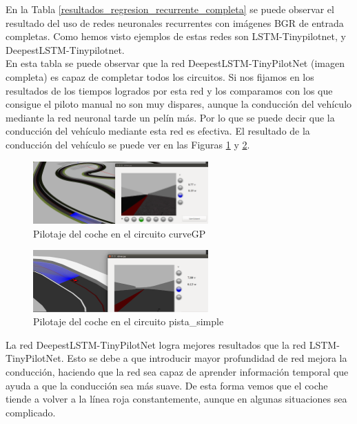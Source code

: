 En la Tabla \ref{resultados_regresion_recurrente_completa} se puede observar el resultado del uso de redes neuronales recurrentes con imágenes BGR de entrada completas. Como hemos visto ejemplos de estas redes son LSTM-Tinypilotnet, y DeepestLSTM-Tinypilotnet.\\

En esta tabla se puede observar que la red DeepestLSTM-TinyPilotNet (imagen completa) es capaz de completar todos los circuitos. Si nos fijamos en los resultados de los tiempos logrados por esta red y los comparamos con los que consigue el piloto manual no son muy dispares, aunque la conducción del vehículo mediante la red neuronal tarde un pelín más. Por lo que se puede decir que la conducción del vehículo mediante esta red es efectiva. El resultado de la conducción del vehículo se puede ver en las Figuras \ref{fig.curve_reg} y \ref{fig.small_reg}.\\

\begin{figure}
\begin{center}
	\includegraphics[width=0.6\textwidth]{figures/Regresion/deep_curve.png}
   \caption{Pilotaje del coche en el circuito curveGP}
	\label{fig.curve_reg}
\end{center}
\end{figure}

\begin{figure}
\begin{center}
	\includegraphics[width=0.6\textwidth]{figures/Regresion/deep_small.png}
   \caption{Pilotaje del coche en el circuito pista\_simple}
	\label{fig.small_reg}
\end{center}
\end{figure}



La red DeepestLSTM-TinyPilotNet logra mejores resultados que la red LSTM-TinyPilotNet. Esto se debe a que introducir mayor profundidad de red mejora la conducción, haciendo que la red sea capaz de aprender información temporal que ayuda a que la conducción sea más suave. De esta forma vemos que el coche tiende a volver a la línea roja constantemente, aunque en algunas situaciones sea complicado. \\


